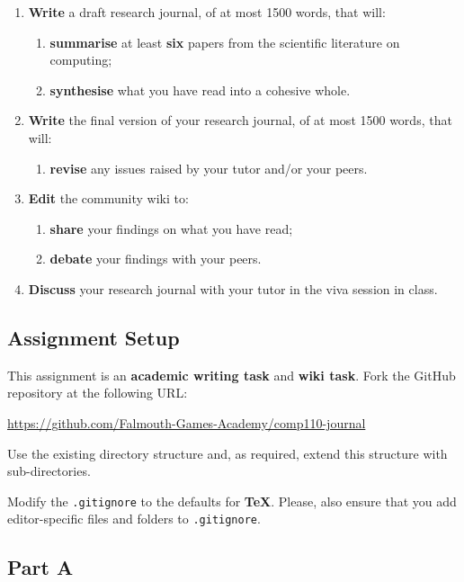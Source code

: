 \documentclass{../../fal_assignment}
\begin{document}
\begin{enumerate}[label=(\Alph*)]
    \item \textbf{Write} a draft research journal, of at most 1500 words, that will:
    	\begin{enumerate}[label=(\roman*)]
    		\item \textbf{summarise} at least \textbf{six} papers from the scientific literature on computing;
    		\item \textbf{synthesise} what you have read into a cohesive whole.
    	\end{enumerate}
    \item \textbf{Write} the final version of your research journal, of at most 1500 words, that will:
    	\begin{enumerate}[label=(\roman*)]
    		\item \textbf{revise} any issues raised by your tutor and/or your peers.
    	\end{enumerate}
    \item \textbf{Edit} the community wiki to:
    	\begin{enumerate}[label=(\roman*)]
    		\item \textbf{share} your findings on what you have read;
    		\item \textbf{debate} your findings with your peers.
    	\end{enumerate}
    \item \textbf{Discuss} your research journal with your tutor in the viva session in class.
\end{enumerate}

\subsection*{Assignment Setup}

This assignment is an \textbf{academic writing task} and \textbf{wiki task}. Fork the GitHub repository at the following URL:

\indent \url{https://github.com/Falmouth-Games-Academy/comp110-journal}

Use the existing directory structure and, as required, extend this structure with sub-directories.

Modify the \texttt{.gitignore} to the defaults for \textbf{TeX}. Please, also ensure that you add editor-specific files and folders to \texttt{.gitignore}. 

\subsection*{Part A}
\end{document}
